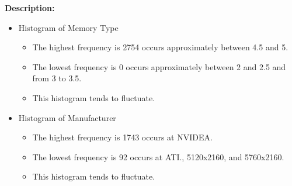 \textbf{Description:}
\begin{itemize}
    \item Histogram of Memory Type
    \begin{itemize}
        \item The highest frequency is 2754 occurs approximately between 4.5 and 5.
        \item The lowest frequency is 0 occurs approximately between 2 and 2.5 and from 3 to 3.5.
        \item This histogram tends to fluctuate.
    \end{itemize}

    \item Histogram of Manufacturer
    \begin{itemize}
        \item The highest frequency is 1743 occurs at NVIDEA.
        \item The lowest frequency is 92 occurs at ATI., 5120x2160, and 5760x2160.
        \item  This histogram tends to fluctuate.
    \end{itemize}
\end{itemize}

